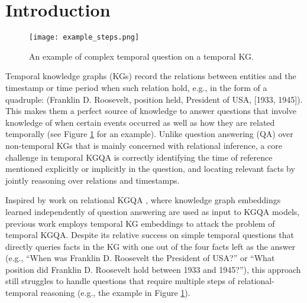\documentclass[11pt]{article}
\begin{document}
\section{Introduction}

\begin{figure}[ht]
  \centering
  \texttt{[image: example\_steps.png]}
  \caption{An example of complex temporal question on a temporal KG. }
  \label{fig:example}
\end{figure}



Temporal knowledge graphs (KGs) record the relations between entities and the timestamp or time period when such relation hold, e.g., in the form of a quadruple: (Franklin D. Roosevelt, position held, President of USA, [1933, 1945]).
This makes them a perfect source of knowledge to answer questions that involve knowledge of when certain events occurred as well as how they are related temporally (see Figure \ref{fig:example} for an example).
Unlike question answering (QA) over non-temporal KGs that is mainly concerned with relational inference, a core challenge in temporal KGQA is correctly identifying the time of reference mentioned explicitly or implicitly in the question, and locating relevant facts by jointly reasoning over relations and timestamps.

Inspired by work on relational KGQA \citep{huang2019knowledge, saxena2020improving}, where knowledge graph embeddings \cite{dasgupta2018hyte, garcia2018learning, goel2020diachronic, wu2020temp, lacroix2020tensor} learned independently of question answering are used as input to KGQA models, previous work \cite{saxena2021question} employs temporal KG embeddings to attack the problem of temporal KGQA.
Despite its relative success on simple temporal questions that directly queries facts in the KG with one out of the four facts left as the answer (e.g., ``When was Franklin D. Roosevelt the President of USA?'' or ``What position did Franklin D. Roosevelt hold between 1933 and 1945?''), this approach still struggles to handle questions that require multiple steps of relational-temporal reasoning (e.g., the example in Figure \ref{fig:example}).
 
\end{document}
